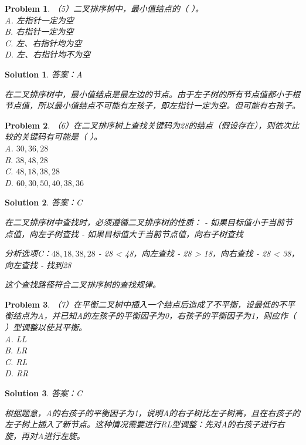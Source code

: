 \documentclass[12pt,a4paper]{amsart}
\newtheorem{problem}{Problem}[section]
\newtheorem{solution}{Solution}[section]
\begin{document}
\begin{problem}
（5）二叉排序树中，最小值结点的（ ）。\\
A. 左指针一定为空\\
B. 右指针一定为空\\
C. 左、右指针均为空\\
D. 左、右指针均不为空
\end{problem}

\begin{solution}
答案：A

在二叉排序树中，最小值结点是最左边的节点。由于左子树的所有节点值都小于根节点值，所以最小值结点不可能有左孩子，即左指针一定为空。但可能有右孩子。
\end{solution}

\begin{problem}
（6）在二叉排序树上查找关键码为28的结点（假设存在），则依次比较的关键码有可能是（ ）。\\
A. $30,36,28$\\
B. $38,48,28$\\
C. $48,18,38,28$\\
D. $60,30,50,40,38,36$
\end{problem}

\begin{solution}
答案：C

在二叉排序树中查找时，必须遵循二叉排序树的性质：
- 如果目标值小于当前节点值，向左子树查找
- 如果目标值大于当前节点值，向右子树查找

分析选项C：$48,18,38,28$
- 28 < 48，向左查找
- 28 > 18，向右查找  
- 28 < 38，向左查找
- 找到28

这个查找路径符合二叉排序树的查找规律。
\end{solution}

\begin{problem}
（7）在平衡二叉树中插入一个结点后造成了不平衡，设最低的不平衡结点为A，并已知A的左孩子的平衡因子为0，右孩子的平衡因子为1，则应作（ ）型调整以使其平衡。\\
A. LL\\
B. LR\\
C. RL\\
D. RR
\end{problem}

\begin{solution}
答案：C

根据题意，A的右孩子的平衡因子为1，说明A的右子树比左子树高，且在右孩子的左子树上插入了新节点。这种情况需要进行RL型调整：先对A的右孩子进行右旋，再对A进行左旋。
\end{solution}
\end{document}
